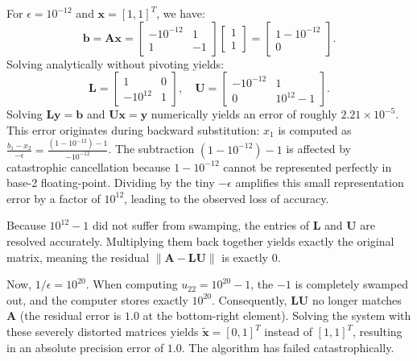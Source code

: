 \begin{solution}

	For $\epsilon = 10^{-12}$ and $\mathbf{x} = [1, 1]^T$, we have:
	\[
		\mathbf{b} = \mathbf{A}\mathbf{x} = \begin{bmatrix} -10^{-12} & 1 \\ 1 &
		                -1\end{bmatrix} \begin{bmatrix} 1 \\ 1 \end{bmatrix} = \begin{bmatrix}1 -
			10^{-12} \\ 0\end{bmatrix}.
	\]
	Solving analytically without pivoting yields:
	\[
		\mathbf{L} = \begin{bmatrix} 1 & 0 \\ -10^{12} & 1 \end{bmatrix}, \quad
		\mathbf{U} = \begin{bmatrix} -10^{-12} & 1 \\ 0 & 10^{12} - 1 \end{bmatrix}.
	\]
	Solving $\mathbf{L}\mathbf{y} = \mathbf{b}$ and $\mathbf{U}\mathbf{x} =
		\mathbf{y}$ numerically yields an error of roughly $2.21 \times 10^{-5}$. This
	error originates during backward substitution: $x_1$ is computed as $\frac{b_1 -
			x_2}{-\epsilon} = \frac{(1 - 10^{-12}) - 1}{-10^{-12}}$. The subtraction $(1 -
		10^{-12}) - 1$ is affected by catastrophic cancellation because $1 - 10^{-12}$
	cannot be represented perfectly in base-2 floating-point. Dividing by the tiny
	$-\epsilon$ amplifies this small representation error by a factor of $10^{12}$,
	leading to the observed loss of accuracy.

	Because $10^{12}-1$ did not suffer from swamping, the entries of
	$\mathbf{L}$ and $\mathbf{U}$ are resolved accurately. Multiplying them back
	together yields exactly the original matrix, meaning the residual $\|\mathbf{A}
		- \mathbf{LU}\|$ is exactly $0$.

	Now, $1/\epsilon = 10^{20}$. When computing $u_{22} = 10^{20} - 1$, the $-1$
	is completely swamped out, and the computer stores exactly $10^{20}$.
	Consequently, $\mathbf{L}\mathbf{U}$ no longer matches $\mathbf{A}$ (the
	residual error is $1.0$ at the bottom-right element). Solving the system with
	these severely distorted matrices yields $\tilde{\mathbf{x}} =[0, 1]^T$ instead
	of $[1, 1]^T$, resulting in an absolute precision error of $1.0$. The algorithm
	has failed catastrophically.


\end{solution}
